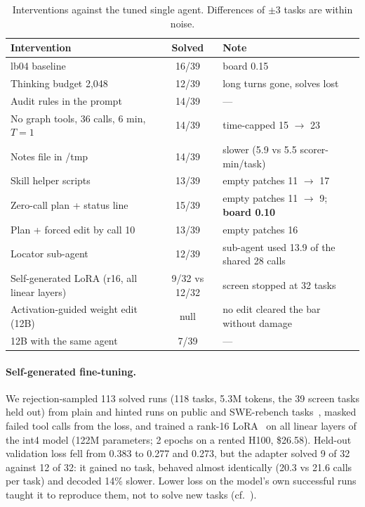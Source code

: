 \documentclass[11pt]{article}
\begin{document}
\begin{table}[h]
\centering\small
\begin{tabularx}{\linewidth}{Xcl}
\toprule
Intervention & Solved & Note \\
\midrule
lb04 baseline & 16/39 & board 0.15 \\
Thinking budget 2,048 & 12/39 & long turns gone, solves lost \\
Audit rules in the prompt & 14/39 & --- \\
No graph tools, 36 calls, 6 min, $T{=}1$ & 14/39 & time-capped 15 $\to$ 23 \\
Notes file in /tmp & 14/39 & slower (5.9 vs 5.5 scorer-min/task) \\
Skill helper scripts & 13/39 & empty patches 11 $\to$ 17 \\
Zero-call plan + status line & 15/39 & empty patches 11 $\to$ 9; \textbf{board 0.10} \\
Plan + forced edit by call 10 & 13/39 & empty patches 16 \\
Locator sub-agent & 12/39 & sub-agent used 13.9 of the shared 28 calls \\
Self-generated LoRA (r16, all linear layers) & 9/32 vs 12/32 & screen stopped at 32 tasks \\
Activation-guided weight edit (12B) & null & no edit cleared the bar without damage \\
12B with the same agent & 7/39 & --- \\
\bottomrule
\end{tabularx}
\caption{Interventions against the tuned single agent. Differences of $\pm$3 tasks are within noise.}
\label{tab:interventions}
\end{table}

\paragraph{Self-generated fine-tuning.} We rejection-sampled 113 solved runs (118 tasks, 5.3M tokens, the 39 screen tasks held out) from plain and hinted runs on public and SWE-rebench tasks~\citep{zelikman2022star}, masked failed tool calls from the loss, and trained a rank-16 LoRA~\citep{hu2022lora,dettmers2023qlora} on all linear layers of the int4 model (122M parameters; 2 epochs on a rented H100, \$26.58). Held-out validation loss fell from 0.383 to 0.277 and 0.273, but the adapter solved 9 of 32 against 12 of 32: it gained no task, behaved almost identically (20.3 vs 21.6 calls per task) and decoded 14\% slower. Lower loss on the model's own successful runs taught it to reproduce them, not to solve new tasks (cf.~\citep{pan2025swegym}).
\end{document}
